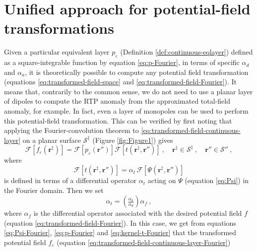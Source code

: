 \documentclass[manuscript,noblind]{geophysics}
\begin{document}
	\section{Unified approach for potential-field transformations}
	
	Given a particular equivalent layer $p_{\varepsilon}$ (Definition \ref{def:continuous-eqlayer}) 
	defined as a square-integrable function by equation \ref{eq:p-Fourier}, in terms of specific $\alpha_{d}$ and $\alpha_{a}$, 
	it is theoretically possible to compute any potential field transformation (equations \ref{eq:transformed-field-space} and 
	\ref{eq:transformed-field-Fourier}).
	It means that, contrarily to the common sense, we do not need to use a planar layer of dipoles to compute the RTP anomaly from 
	the approximated total-field anomaly, for example. In fact, even a layer of monopoles can be used to perform this potential-field transformation. 
	This can be verified by first noting that applying the Fourier-convolution theorem to \ref{eq:transformed-field-continuous-layer} 
	on a planar surface $\mathcal{S}^{\ddagger}$ (Figure \ref{fig:Figure1}) gives
	\begin{equation}
		\mathcal{F} [ f_{\varepsilon}(\mathbf{r}^{\ddagger}) ] =
		\mathcal{F} \left[ p_{\varepsilon}(\mathbf{r}'') \right]
		\mathcal{F} [ t(\mathbf{r}^{\ddagger}, \mathbf{r}'') ] \: , 
		\quad \mathbf{r}^{\ddagger} \in \mathcal{S}^{\ddagger} \: ,
		\quad \mathbf{r}'' \in \mathcal{S}'' \: ,
		\label{eq:transformed-field-continuous-layer-Fourier}
	\end{equation}
	where
	\begin{equation}
		\mathcal{F} [ t(\mathbf{r}^{\ddagger}, \mathbf{r}'') ] = \alpha_{t} \, \mathcal{F} [ \Psi(\mathbf{r}^{\ddagger}, \mathbf{r}'') ]
		\label{eq:kernel-t-Fourier}
	\end{equation}
	is defined in terms of a differential operator $\alpha_{t}$ acting on $\Psi$ (equation \ref{eq:Psi}) in the Fourier domain.
	Then we set 
	\begin{equation}
		\alpha_{t} = \left( \tfrac{\alpha_{a}}{\alpha_{d}} \right) \alpha_{f} \: ,
		\label{eq:alpha-t-generic}
	\end{equation}
	where $\alpha_{f}$ is the differential operator associated with the desired potential field $f$ (equation \ref{eq:transformed-field-Fourier}).
	In this case, we get from equations \ref{eq:Psi-Fourier}, \ref{eq:p-Fourier}  and \ref{eq:kernel-t-Fourier} 
	that the transformed potential field $f_{\varepsilon}$ (equation \ref{eq:transformed-field-continuous-layer-Fourier}) 
\end{document}
